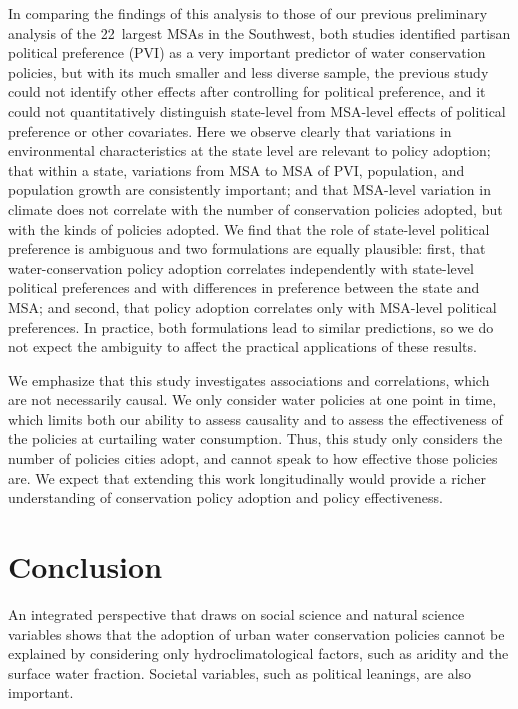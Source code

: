 \documentclass[draft,linenumbers]{agujournal}\usepackage{knitr}
\begin{document}
In comparing the findings of this analysis to those of our previous preliminary
analysis of the 22~largest MSAs in the Southwest, both studies identified
partisan political preference (PVI)
as a very important predictor of water conservation policies, but with its much
smaller and less diverse sample, the previous study could not identify other
effects after controlling for
political preference,
and it could not quantitatively distinguish state-level from MSA-level effects of
political preference
or other covariates.
Here we observe clearly that variations in
environmental
characteristics at the state level are relevant to policy adoption;
that within a state, variations from MSA to MSA of PVI, population,
and population growth are consistently important;
and that MSA-level variation in climate does not correlate with the number of
conservation policies adopted, but with the kinds of policies adopted.
We find that the role of state-level political preference is ambiguous and two formulations
are equally plausible: first, that water-conservation policy adoption correlates independently with
state-level political preferences and with differences in preference between the state and MSA;
and second, that policy adoption correlates only with MSA-level political preferences.
In practice, both formulations lead to similar predictions, so we do not expect the ambiguity to
affect the practical applications of these results.

We emphasize that this study investigates associations and correlations, which
are not necessarily causal.
We only consider water policies at one point in time, which limits both our
ability to assess causality and to assess the effectiveness of the policies
at curtailing water consumption.
Thus, this study only considers the number of
policies cities adopt, and cannot speak to how effective those policies are.
We expect that extending this work longitudinally would provide a richer
understanding of conservation policy adoption and policy effectiveness.

\section{Conclusion}
An integrated perspective that draws on social science and natural science
variables shows that the adoption of urban water conservation policies cannot be
explained by considering only hydroclimatological factors, such as aridity and
the surface water fraction. Societal variables, such as political leanings, are
also important.
\end{document}
